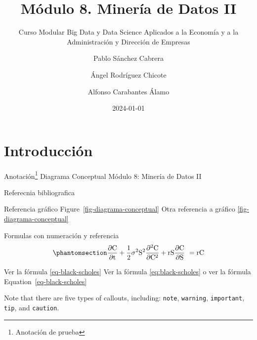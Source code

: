 \documentclass[
  a4paper,
  DIV=11,
  numbers=noendperiod]{scrreprt}
\title{Módulo 8. Minería de Datos II}
\subtitle{Curso Modular Big Data y Data Science Aplicados a la Economía
y a la Administración y Dirección de Empresas}
\author{Pablo Sánchez Cabrera \and Ángel Rodríguez Chicote \and Alfonso
Carabantes Álamo}
\date{2024-01-01}
\renewcommand{\figurename}{Imagen}
\renewcommand*\contentsname{Table of contents}
\newcommand\contentsname{Table of contents}
\renewcommand*\figurename{Figure}
\newcommand\figurename{Figure}
\begin{document}
\maketitle

\renewcommand{\figurename}{Imagen}


\renewcommand*\contentsname{Índice}
{
\hypersetup{linkcolor=}
\setcounter{tocdepth}{2}
\tableofcontents
}

\chapter*{Introducción}\label{introducciuxf3n}


Anotación\footnote{Anotación de prueba} Diagrama Conceptual Módulo 8:
Minería de Datos II

Referecnia bibliografica \autocite{knuth84}

Referencia gráfico Figure~\ref{fig-diagrama-conceptual} Otra referencia
a gráfico \ref{fig-diagrama-conceptual}

Formulas con numeración y referencia
\begin{equation}\phantomsection\label{eq-black-scholes}{
\frac{\partial \mathrm C}{ \partial \mathrm t } + \frac{1}{2}\sigma^{2} \mathrm S^{2}
\frac{\partial^{2} \mathrm C}{\partial \mathrm C^2}
  + \mathrm r \mathrm S \frac{\partial \mathrm C}{\partial \mathrm S}\ =
  \mathrm r \mathrm C 
}\end{equation}

Ver la fórmula \ref{eq-black-scholes} Ver la fórmula
\ref{eq:black-scholes} o ver la fórmula Equation~\ref{eq-black-scholes}

\begin{tcolorbox}[enhanced jigsaw, title=\textcolor{quarto-callout-note-color}{\faInfo}\hspace{0.5em}{Nota:}, toprule=.15mm, breakable, opacityback=0, rightrule=.15mm, arc=.35mm, bottomrule=.15mm, toptitle=1mm, colframe=quarto-callout-note-color-frame, colbacktitle=quarto-callout-note-color!10!white, colback=white, coltitle=black, opacitybacktitle=0.6, bottomtitle=1mm, titlerule=0mm, leftrule=.75mm, left=2mm]

Note that there are five types of callouts, including: \texttt{note},
\texttt{warning}, \texttt{important}, \texttt{tip}, and
\texttt{caution}.

\end{tcolorbox}
\end{document}
